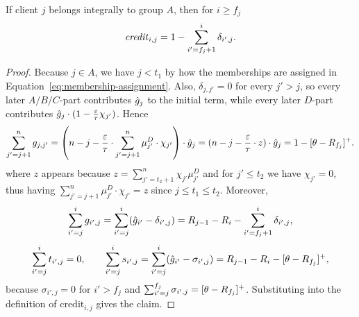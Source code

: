 \begin{lemma}
    \label{lem:credit-A-after}
    If client $j$ belongs integrally to group $A$, then for $i \geq f_j$
    \begin{equation*}
        \text{\emph{credit}}_{i,j} = 1 - \sum_{i'=f_j+1}^i \delta_{i',j}.
    \end{equation*}
\end{lemma}
\begin{proof}
    Because $j \in A$, we have $j < t_1$ by how the memberships are assigned in Equation~\ref{eq:membership-assignment}. Also, $\delta_{j,j'}=0$ for every $j' > j$, so every later $A/B/C$-part contributes $\hat{g}_j$ to the initial term, while every later $D$-part contributes $\hat{g}_j \cdot (1-\frac{\varepsilon}{\tau} \chi_{j'})$. Hence
    \begin{equation*}
        \sum_{j'=j+1}^n g_{j,j'} = \left(n-j-\frac{\varepsilon}{\tau} \cdot \sum_{j'=j+1}^n \mu_{j'}^D \cdot \chi_{j'}\right) \cdot \hat{g}_j =  (n-j-\frac{\varepsilon}{\tau} \cdot z) \cdot \hat{g}_j = 1 - [\theta - R_{f_j}]^+.
    \end{equation*}
    where $z$ appears because $z=\sum_{j'=t_2+1}^{n}\chi_{j'} \mu_{j'}^D$ and for $j' \le t_2$ we have $\chi_{j'}=0$, thus having $\sum_{j'=j+1}^n \mu_{j'}^D \cdot \chi_{j'} = z$ since $j \leq t_1 \leq t_2$.
    Moreover,
    \begin{equation*}
        \sum_{i'=j}^{i} g_{i',j} = \sum_{i'=j}^{i} (\hat{g}_{i'}-\delta_{i',j}) = R_{j-1}-R_i-\sum_{i'=f_j+1}^{i} \delta_{i',j},
    \end{equation*}
    \begin{equation*}
        \sum_{i'=j}^{i} t_{i',j} = 0,
        \qquad
        \sum_{i'=j}^{i} s_{i',j} = \sum_{i'=j}^{i} (\hat{g}_{i'}-\sigma_{i',j}) = R_{j-1}-R_i-[\theta-R_{f_j}]^+,
    \end{equation*}
    because $\sigma_{i',j}=0$ for $i'>f_j$ and $\sum_{i'=j}^{f_j} \sigma_{i',j}=[\theta-R_{f_j}]^+$.
    Substituting into the definition of $\text{credit}_{i,j}$ gives the claim.
\end{proof}

